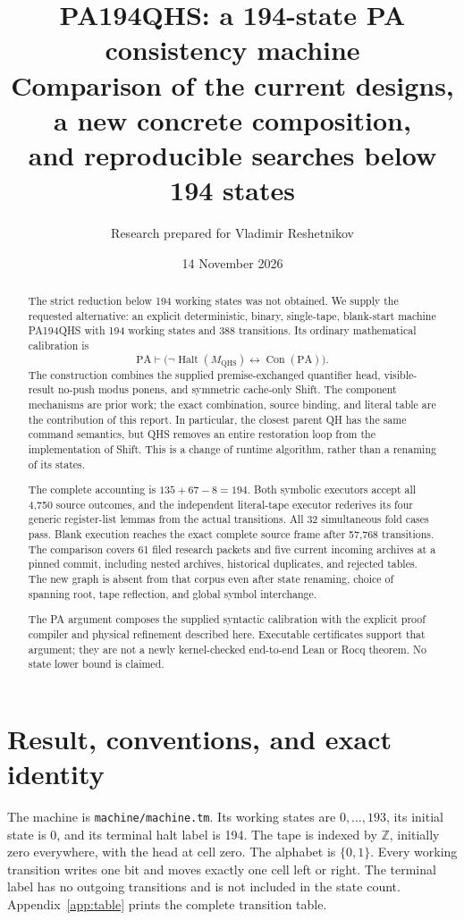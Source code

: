 \documentclass[11pt,letterpaper]{article}
\title{PA194QHS: a 194-state PA consistency machine\\[5pt]
\large Comparison of the current designs, a new concrete composition,\\and reproducible searches below 194 states}
\author{Research prepared for Vladimir Reshetnikov}
\date{14 November 2026}
\newcommand{\PA}{\mathrm{PA}}
\newcommand{\Con}{\operatorname{Con}}
\newcommand{\Halt}{\operatorname{Halt}}
\newcommand{\file}[1]{\texttt{\nolinkurl{#1}}}
\newcommand{\QHS}{M_{\mathrm{QHS}}}
\begin{document}
\maketitle
\begin{abstract}
The strict reduction below 194 working states was not obtained. We supply
the requested alternative: an explicit deterministic, binary, single-tape,
blank-start machine PA194QHS with 194 working states and 388 transitions.
Its ordinary mathematical calibration is
\[
 \PA\vdash\bigl(\neg\Halt(\QHS)\leftrightarrow\Con(\PA)\bigr).
\]
The construction combines the supplied premise-exchanged quantifier head,
visible-result no-push modus ponens, and symmetric cache-only Shift.
The component mechanisms are prior work; the exact combination, source
binding, and literal table are the contribution of this report. In particular,
the closest parent QH has the same command semantics, but QHS removes an
entire restoration loop from the implementation of Shift. This is a
change of runtime algorithm, rather than a renaming of its states.

The complete accounting is $135+67-8=194$. Both symbolic executors accept
all 4,750 source outcomes, and the independent literal-tape executor
rederives its four generic register-list lemmas from the actual transitions.
All 32 simultaneous fold cases pass. Blank execution reaches the exact
complete source frame after 57,768 transitions. The comparison covers
61 filed research packets and five current incoming archives at a pinned
commit, including nested archives, historical duplicates, and rejected
tables. The new graph is absent from that corpus even after state renaming,
choice of spanning root, tape reflection, and global symbol interchange.

The PA argument composes the supplied syntactic calibration with the
explicit proof compiler and physical refinement described here. Executable
certificates support that argument; they are not a newly kernel-checked
end-to-end Lean or Rocq theorem. No state lower bound is claimed.
\end{abstract}
\clearpage\tableofcontents\clearpage

\section{Result, conventions, and exact identity}

The machine is \file{machine/machine.tm}. Its working states are
$0,\ldots,193$, its initial state is 0, and its terminal halt label is 194.
The tape is indexed by $\mathbb Z$, initially zero everywhere, with the
head at cell zero. The alphabet is $\{0,1\}$. Every working transition writes
one bit and moves exactly one cell left or right. The terminal label has
no outgoing transitions and is not included in the state count.
Appendix~\ref{app:table} prints the complete transition table.
\end{document}
